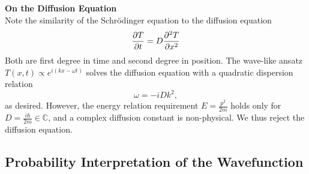 \documentclass[11pt, a4paper]{article}
\newcommand{\Schro}{Schr\"{o}dinger\xspace}
\begin{document}
\vspace{2mm}
\textbf{On the Diffusion Equation}\\
Note the similarity of the \Schro equation to the diffusion equation
\begin{equation*}
	\pdv{T}{t} = D \pdv[2]{T}{x}
\end{equation*}
Both are first degree in time and second degree in position. The wave-like ansatz $ T(x, t) \propto e^{i(kx - \omega t)} $ solves the diffusion equation with a quadratic dispersion relation
\begin{equation*}
	\omega = -iDk^{2},
\end{equation*}
as desired. However, the energy relation requirement $ E = \frac{p^{2}}{2m} $ holds only for $ D = \frac{i\hbar}{2m} \in \mathbb{C} $, and a complex diffusion constant is non-physical. We thus reject the diffusion equation.

\subsection{Probability Interpretation of the Wavefunction}
\end{document}
